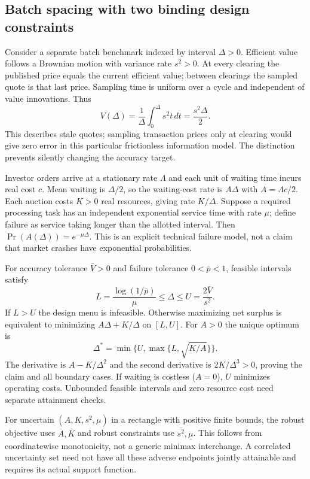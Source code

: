 \documentclass[11pt]{article}
\begin{document}
\subsection*{Batch spacing with two binding design constraints}
Consider a separate batch benchmark indexed by interval $\Delta>0$.
Efficient value follows a Brownian motion with variance rate $s^2>0$.
At every clearing the published price equals the current efficient value;
between clearings the sampled quote is that last price. Sampling time is
uniform over a cycle and independent of value innovations. Thus
\[
 V(\Delta)=\frac1\Delta\int_0^\Delta s^2t\,dt
 =\frac{s^2\Delta}{2}.
\]
This describes stale quotes; sampling transaction prices only at clearing
would give zero error in this particular frictionless information model.
The distinction prevents silently changing the accuracy target.

Investor orders arrive at a stationary rate $\Lambda$ and each unit of
waiting time incurs real cost $c$. Mean waiting is $\Delta/2$, so the
waiting-cost rate is $A\Delta$ with $A=\Lambda c/2$. Each auction costs
$K>0$ real resources, giving rate $K/\Delta$. Suppose a required processing
task has an independent exponential service time with rate $\mu$; define
failure as service taking longer than the allotted interval. Then
$\Pr(A(\Delta))=e^{-\mu\Delta}$. This is an explicit technical failure
model, not a claim that market crashes have exponential probabilities.

For accuracy tolerance $\bar V>0$ and failure tolerance
$0<\bar p<1$, feasible intervals satisfy
\[
 L=\frac{\log(1/\bar p)}\mu\leq\Delta\leq
 U=\frac{2\bar V}{s^2}.
\]
If $L>U$ the design menu is infeasible. Otherwise maximizing net surplus
is equivalent to minimizing $A\Delta+K/\Delta$ on $[L,U]$.
For $A>0$ the unique optimum is
\[
 \Delta^*=\min\{U,\max\{L,\sqrt{K/A}\}\}.
\]
The derivative is $A-K/\Delta^2$ and the second derivative is
$2K/\Delta^3>0$, proving the claim and all boundary cases. If waiting is
costless ($A=0$), $U$ minimizes operating costs. Unbounded feasible
intervals and zero resource cost need separate attainment checks.

For uncertain $(A,K,s^2,\mu)$ in a rectangle with positive finite bounds,
the robust objective uses $\overline A,\overline K$ and robust constraints
use $\overline{s^2},\underline\mu$. This follows from coordinatewise
monotonicity, not a generic minimax interchange. A correlated uncertainty
set need not have all these adverse endpoints jointly attainable and
requires its actual support function.
\end{document}
